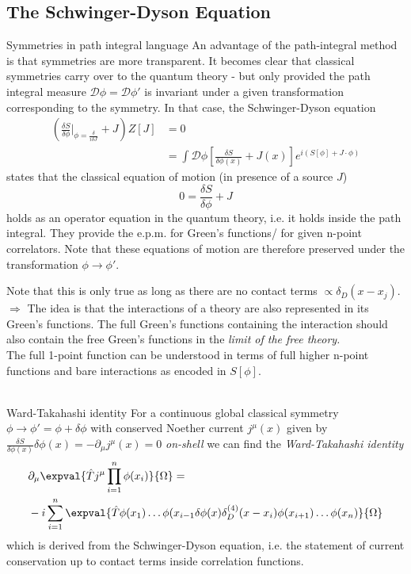 \subsection{The Schwinger-Dyson Equation}
\begin{mybox}{Symmetries in path integral language}
	An advantage of the path-integral method is that symmetries are more transparent. It becomes clear that classical symmetries carry over to the quantum theory -  but only provided the path integral measure $\mathcal{D}\phi =\mathcal{D}\phi'$ is invariant under a given transformation corresponding to the symmetry. In that case, the Schwinger-Dyson equation
	\begin{align}
		\left(\frac{\delta S}{\delta \phi} |_{\phi=\frac{\delta}{i \delta J}} + J\right) Z[J] &= 0\\
		&= \int \mathcal{D}\phi \left[\frac{\delta S}{\delta \phi(x)} + J(x) \right] e^{i\left(S[\phi] + J \cdot \phi \right)}
	\end{align}
states that the classical equation of motion (in presence of a source $J$)
\begin{equation}
	0 = \frac{\delta S}{\delta \phi} + J
\end{equation}
holds as an operator equation in the quantum theory, i.e. it holds inside the path integral. They provide the e.p.m. for Green's functions/ for given n-point correlators. Note that these equations of motion are therefore preserved under the transformation $\phi \rightarrow\phi'$.
\end{mybox}
Note that this is only true as long as there are no contact terms $\propto \delta_D(x-x_j)$.\\
$\Rightarrow$ The idea is that the interactions of a theory are also represented in its Green's functions. The full Green's functions containing the interaction should also contain the free Green's functions in the \emph{limit of the free theory.}\\
The full 1-point function can be understood in terms of full higher n-point functions and bare interactions as encoded in $S[\phi]$.\\
\\
\begin{mybox}{Ward-Takahashi identity}
For a continuous global classical symmetry $\phi \rightarrow \phi' = \phi + \delta \phi$ with conserved Noether current $j^{\mu} (x)$ given by $\frac{\delta S}{\delta \phi(x)}
\delta \phi(x) = - \partial_{\mu} j^{\mu} (x) =0$ \emph{on-shell} we can find the \emph{Ward-Takahashi identity}
\begin{align}
	&\partial_{\mu} \expval{\hat{T} j^{\mu} \prod_{i=1}^{n} \phi(x_i) }{\Omega} = \\
	&-i \sum_{i=1}^{n} \expval{\hat{T} \phi(x_1) \dots \phi(x_{i-1} \delta \phi(x) \delta^{(4)}_D(x-x_i) \phi(x_{i+1}) \dots \phi(x_n) }{\Omega}
\end{align}
which is derived from the Schwinger-Dyson equation, i.e. the statement of current conservation up to contact terms inside correlation functions.
\end{mybox}
